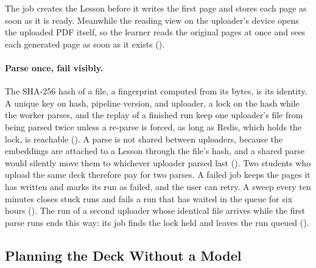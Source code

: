 The job creates the Lesson before it writes the first page and stores each
page as soon as it is ready. Meanwhile the reading view on the uploader's
device opens the uploaded PDF itself, so the learner reads the original pages
at once and sees each generated page as soon as it exists
().

\paragraph{Parse once, fail visibly.}
\label{sec:idempotency}
The SHA-256 hash of a file, a fingerprint computed from its bytes, is its
identity. A unique key on hash, pipeline version, and uploader, a lock on the
hash while the worker parses, and the replay of a finished run keep one
uploader's file from being parsed twice unless a re-parse is forced, as long
as Redis, which holds the lock, is reachable
(). A parse is not shared between
uploaders, because the embeddings are attached to a Lesson through the file's
hash, and a shared parse would silently move them to whichever uploader parsed
last (). Two students who upload the
same deck therefore pay for two parses. A failed job keeps the pages it has
written and marks its run as failed, and the user can retry. A sweep every ten
minutes closes stuck runs and fails a run that has waited in the queue for six
hours (). The run of a second uploader whose
identical file arrives while the first parse runs ends this way: its job finds
the lock held and leaves the run queued
().

\subsection{Planning the Deck Without a Model}
\label{sec:c4-deck-plan}

